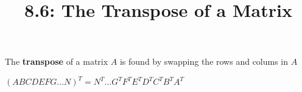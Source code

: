 \documentclass{article}
\title{8.6: The Transpose of a Matrix}
\begin{document}
\maketitle
\begin{definition}
The \textbf{transpose} of a matrix $A$ is found by swapping the rows and colums in $A$  
\end{definition}

$(ABCDEFG...N)^T = N^T...G^TF^TE^TD^TC^TB^TA^T$
\end{document}
